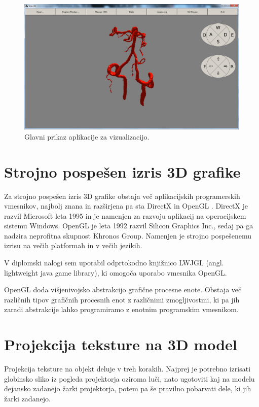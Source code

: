 \documentclass[a4paper, 12pt]{book}
\begin{document}
\begin{figure}[h!]
\begin{center}
\includegraphics[width=13.5cm]{Aplikacija.png}
\end{center}
\caption{Glavni prikaz aplikacije za vizualizacijo.}
\label{aplikacija}
\end{figure}

\section{Strojno pospešen izris 3D grafike}
Za strojno pospešen izris 3D grafike obstaja več aplikacijskih programerskih vmesnikov, najbolj znana in razširjena pa sta DirectX \cite{DirectX} in OpenGL \cite{OpenGL}. DirectX je razvil Microsoft leta 1995 in je namenjen za razvoju aplikacij na operacijskem sistemu Windows. OpenGL je leta 1992 razvil Silicon Graphics Inc., sedaj pa ga nadzira neprofitna skupnost Khronos Group. Namenjen je strojno pospešenemu izrisu na večih platformah in v večih jezikih. 

V diplomski nalogi sem uporabil odprtokodno knjižnico LWJGL (angl. lightweight java game library), ki omogoča uporabo vmesnika OpenGL.

OpenGL doda višjenivojsko abstrakcijo grafične procesne enote. Obstaja več različnih tipov grafičnih procesnih enot z različnimi zmogljivostmi, ki pa jih zaradi abstrakcije lahko programiramo z enotnim programskim vmesnikom. 
\section{Projekcija teksture na 3D model}

Projekcija teksture na objekt deluje v treh korakih. Najprej je potrebno izrisati globinsko sliko iz pogleda projektorja oziroma luči, nato ugotoviti kaj na modelu dejansko zadanejo žarki projektorja, potem pa še pravilno pobarvati dele, ki jih žarki zadanejo.
\end{document}
